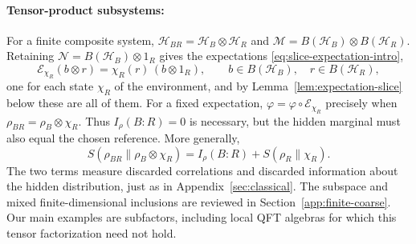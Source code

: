 \documentclass[a4paper,11pt]{article}
\theoremstyle{definition}
\newcommand{\mR}{\mathcal{R}}
\newcommand{\mN}{\mathcal{N}}
\newcommand{\mH}{\mathcal{H}}
\newcommand{\mM}{\mathcal{M}}
\newcommand{\mE}{\mathcal{E}}
\begin{document}
\paragraph{Tensor-product subsystems:}
For a finite composite system, $\mathcal H_{BR}=\mH_B\otimes\mH_R$ and
$\mM=B(\mathcal H_B)\otimes B(\mathcal H_R)$. Retaining $\mN=B(\mathcal H_B)\otimes1_R$ gives the expectations \eqref{eq:slice-expectation-intro},
\begin{equation}\label{condexp}
 \mE_{\chi_R}(b\otimes r)=\chi_R(r)\,(b\otimes1_R),
 \qquad b\in B(\mathcal H_B),\quad r\in B(\mathcal H_R),
\end{equation}
one for each state $\chi_R$ of the environment, and by Lemma~\ref{lem:expectation-slice} below these are all of them.
For a fixed expectation, $\varphi=\varphi\circ\mE_{\chi_R}$ precisely when
$\rho_{BR}=\rho_B\otimes\chi_R$. Thus $I_\rho(B:R)=0$ is necessary, but the hidden
marginal must also equal the chosen reference. More generally,
\begin{equation}\label{eq:quantum-coarse-entropy-decomposition}
 S(\rho_{BR}\|\rho_B\otimes\chi_R)
 =I_\rho(B:R)+S(\rho_R\|\chi_R).
\end{equation}
The two terms measure discarded correlations and discarded information about the
hidden distribution, just as in Appendix~\ref{sec:classical}.
The subspace and mixed finite-dimensional inclusions are reviewed in
Section~\ref{app:finite-coarse}. Our main examples are subfactors, including
local QFT algebras for which this tensor factorization need not hold.
\end{document}
